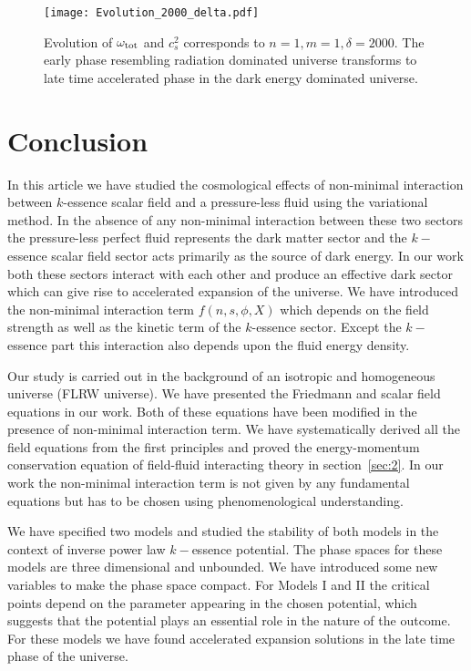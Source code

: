 \documentclass[a4paper,12pt]{article}
\begin{document}
\begin{figure}[t!]
	\centering
	\texttt{[image: Evolution\_2000\_delta.pdf]}
	\caption{Evolution of $\omega_{\rm tot} $ and $ c_{s}^2 $ corresponds to $n=1,  m=1, \delta = 2000$. The  early phase resembling radiation dominated universe transforms to late time accelerated phase in the dark energy dominated universe.}
\label{fig:M2c2}
\end{figure}
\section{Conclusion}
\label{sec:5}

In this article we have studied the cosmological effects of non-minimal interaction between $k$-essence scalar field and a pressure-less fluid using the variational method. In the absence of any non-minimal interaction between these two sectors the pressure-less perfect fluid represents the dark matter sector and the $k-$essence scalar field sector acts primarily as the source of dark energy. In our work both these sectors interact with each other and produce an effective dark sector which can give rise to accelerated expansion of the universe. We have introduced the non-minimal interaction term $f(n,s,\phi, X)$ which depends on the field strength as well as the kinetic term of the $k$-essence sector. Except the $k-$essence part this interaction also depends upon the fluid energy density.

Our study is carried out in the background of an isotropic and homogeneous universe (FLRW universe). We have presented the Friedmann and scalar field equations in our work. Both of these equations have been modified in the presence of non-minimal interaction term. We have systematically derived all the field equations from the first principles and proved the energy-momentum conservation equation of field-fluid interacting theory in section~\ref{sec:2}. In our work the non-minimal interaction term is not given by any fundamental equations but has to be chosen using phenomenological understanding.

We have specified two models and studied the stability of both models in the context of inverse power law $k-$essence potential. The phase spaces for these models are three dimensional and unbounded. We have introduced some new variables to make the phase space compact. For Models I and II the critical points depend on the parameter appearing in the chosen potential, which suggests that the potential plays an essential role in the nature of the outcome. For these models we have found  accelerated expansion solutions in the late time phase of the universe.
\end{document}
